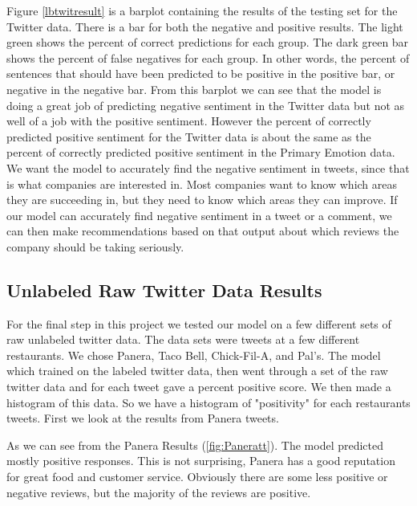 \documentclass[titlepage,letterpaper]{article}
\begin{document}
Figure \ref{lbtwitresult} is a barplot containing the results of the testing set for the Twitter data. There is a bar for both the negative and positive results. The light green shows the percent of correct predictions for each group. The dark green bar shows the percent of false negatives for each group. In other words, the percent of sentences that should have been predicted to be positive in the positive bar, or negative in the negative bar. From this barplot we can see that the model is doing a great job of predicting negative sentiment in the Twitter data but not as well of a job with the positive sentiment. However the percent of correctly predicted positive sentiment for the Twitter data is about the same as the percent of correctly predicted positive sentiment in the Primary Emotion data. We want the model to accurately find the negative sentiment in tweets, since that is what companies are interested in. Most companies want to know which areas they are succeeding in, but they need to know which areas they can improve. If our model can accurately find negative sentiment in a tweet or a comment, we can then make recommendations based on that output about which reviews the company should be taking seriously. 



\subsection{Unlabeled Raw Twitter Data Results}



For the final step in this project we tested our model on a few different sets of raw unlabeled twitter data. The data sets were tweets at a few different restaurants. We chose Panera, Taco Bell, Chick-Fil-A, and Pal's. The model which trained on the labeled twitter data, then went through a set of the raw twitter data and for each tweet gave a percent positive score. We then made a histogram of this data. So we have a histogram of "positivity" for each restaurants tweets. First we look at the results from Panera tweets. 



As we can see from the Panera Results (\cref{fig:Paneratt}). The model predicted mostly positive responses. This is not surprising, Panera has a good reputation for great food and customer service. Obviously there are some less positive or negative reviews, but the majority of the reviews are positive.
\end{document}
